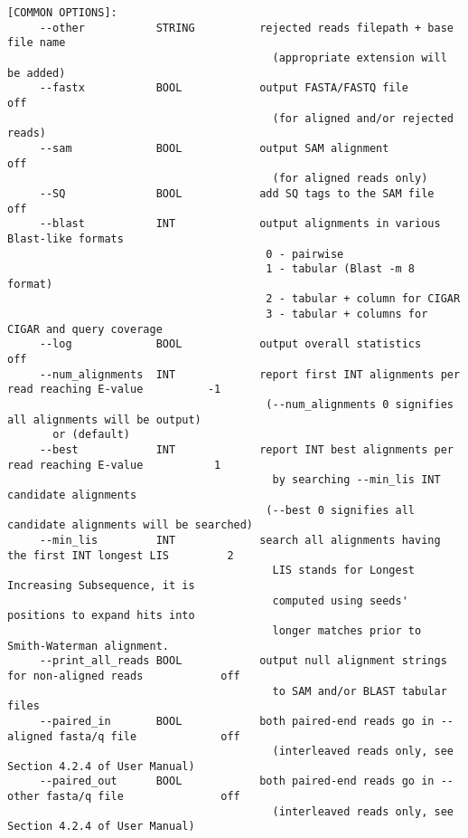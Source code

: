 \documentclass[10pt,a4paper]{article}
\begin{document}
\begin{Verbatim}[fontsize=\footnotesize]
   [COMMON OPTIONS]: 
     --other           STRING          rejected reads filepath + base file name
                                         (appropriate extension will be added)
     --fastx           BOOL            output FASTA/FASTQ file                                        off
                                         (for aligned and/or rejected reads)
     --sam             BOOL            output SAM alignment                                           off
                                         (for aligned reads only)
     --SQ              BOOL            add SQ tags to the SAM file                                    off
     --blast           INT             output alignments in various Blast-like formats                
                                        0 - pairwise
                                        1 - tabular (Blast -m 8 format)
                                        2 - tabular + column for CIGAR 
                                        3 - tabular + columns for CIGAR and query coverage
     --log             BOOL            output overall statistics                                      off
     --num_alignments  INT             report first INT alignments per read reaching E-value          -1
                                        (--num_alignments 0 signifies all alignments will be output)
       or (default)
     --best            INT             report INT best alignments per read reaching E-value           1
                                         by searching --min_lis INT candidate alignments
                                        (--best 0 signifies all candidate alignments will be searched)
     --min_lis         INT             search all alignments having the first INT longest LIS         2
                                         LIS stands for Longest Increasing Subsequence, it is 
                                         computed using seeds' positions to expand hits into
                                         longer matches prior to Smith-Waterman alignment. 
     --print_all_reads BOOL            output null alignment strings for non-aligned reads            off
                                         to SAM and/or BLAST tabular files
     --paired_in       BOOL            both paired-end reads go in --aligned fasta/q file             off
                                         (interleaved reads only, see Section 4.2.4 of User Manual)
     --paired_out      BOOL            both paired-end reads go in --other fasta/q file               off
                                         (interleaved reads only, see Section 4.2.4 of User Manual)

\end{Verbatim}
\end{document}
